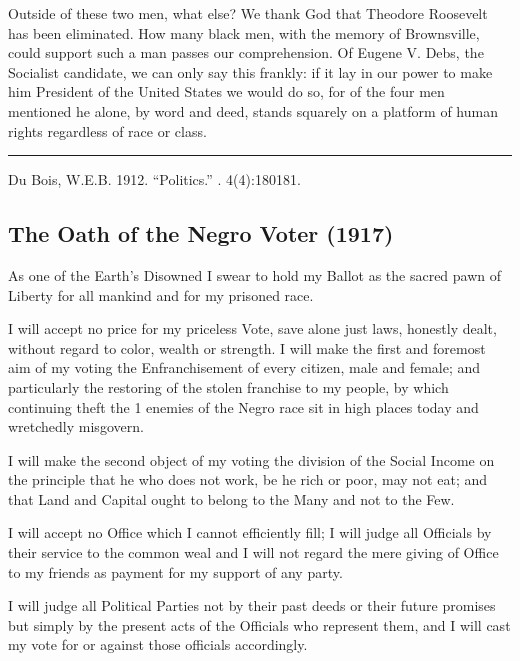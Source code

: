\documentclass[letterpaper,10pt,english]{jupyterBook}
\begin{document}
\sphinxAtStartPar
Outside of these two men, what else? We thank God that Theodore Roosevelt has been eliminated. How many black men, with the memory of Brownsville, could support such a man passes our comprehension. Of Eugene V. Debs, the Socialist candidate, we can only say this frankly: if it lay in our power to make him President of the United States we would do so, for of the four men mentioned he alone, by word and deed, stands squarely on a platform of human rights regardless of race or class.


\bigskip\hrule\bigskip


\sphinxAtStartPar
{} Du Bois, W.E.B. 1912. “Politics.”  . 4(4):180\sphinxhyphen{}181.


\subsection{The Oath of the Negro Voter (1917)}
\label{\detokenize{Volumes/15/01/oath_of_the_negro_voter:the-oath-of-the-negro-voter-1917}}\label{\detokenize{Volumes/15/01/oath_of_the_negro_voter::doc}}
\sphinxAtStartPar
As one of the Earth’s Disowned I swear to hold my Ballot as the sacred pawn of Liberty for all mankind and for my prisoned race.

\sphinxAtStartPar
I will accept no price for my priceless Vote, save alone just laws, honestly dealt, without regard to color, wealth or strength. I will make the first and foremost aim of my voting the Enfranchisement of every citizen, male and female; and particularly the restoring of the stolen franchise to my people, by which continuing theft the 1 enemies of the Negro race sit in high places today and wretchedly misgovern.

\sphinxAtStartPar
I will make the second object of my voting the division of the Social Income on the principle that he who does not work, be he rich or poor, may not eat; and that Land and Capital ought to belong to the Many and not to the Few.

\sphinxAtStartPar
I will accept no Office which I cannot efficiently fill; I will judge all Officials by their service to the common weal and I will not regard the mere giving of Office to my friends as payment for my support of any party.

\sphinxAtStartPar
I will judge all Political Parties not by their past deeds or their future promises but simply by the present acts of the Officials who represent them, and I will cast my vote for or against those officials accordingly.
\end{document}
